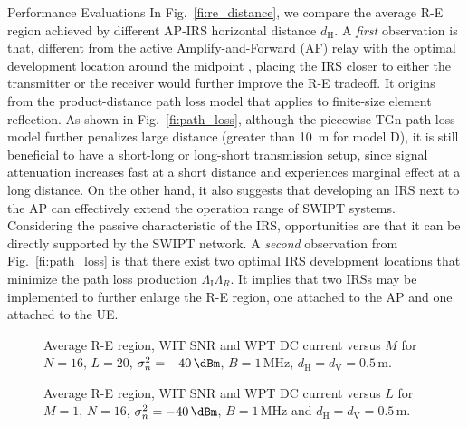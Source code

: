 \documentclass[journal]{IEEEtran}
\begin{document}
\begin{section}{Performance Evaluations}
		In Fig.~\ref{fi:re_distance}, we compare the average R-E region achieved by different AP-IRS horizontal distance $d_{\mathrm{H}}$. A \textit{first} observation is that, different from the active Amplify-and-Forward (AF) relay with the optimal development location around the midpoint \cite{Li2017}, placing the IRS closer to either the transmitter or the receiver would further improve the R-E tradeoff. It origins from the product-distance path loss model that applies to finite-size element reflection. As shown in Fig.~\ref{fi:path_loss}, although the piecewise TGn path loss model further penalizes large distance (greater than \SI{10}{\meter} for model D), it is still beneficial to have a short-long or long-short transmission setup, since signal attenuation increases fast at a short distance and experiences marginal effect at a long distance. On the other hand, it also suggests that developing an IRS next to the AP can effectively extend the operation range of SWIPT systems. Considering the passive characteristic of the IRS, opportunities are that it can be directly supported by the SWIPT network. A \textit{second} observation from Fig.~\ref{fi:path_loss} is that there exist two optimal IRS development locations that minimize the path loss production $\Lambda_{\mathrm{I}}\Lambda_R$. It implies that two IRSs may be implemented to further enlarge the R-E region, one attached to the AP and one attached to the UE.

		\begin{figure}[!t]
			\centering
			\caption{Average R-E region, WIT SNR and WPT DC current versus $M$ for $N=16$, $L=20$, $\sigma_n^2=-40\,\si{\dBm}$, $B=1\,\si{\MHz}$, $d_{\mathrm{H}}=d_{\mathrm{V}}=0.5\,\si{\meter}$.}
		\end{figure}

		\begin{figure}[!t]
			\centering
			\caption{Average R-E region, WIT SNR and WPT DC current versus $L$ for $M=1$, $N=16$, $\sigma_n^2=-40\,\si{\dBm}$, $B=1\,\si{\MHz}$ and $d_{\mathrm{H}}=d_{\mathrm{V}}=0.5\,\si{\meter}$.}
		\end{figure}


\end{section}
\end{document}
